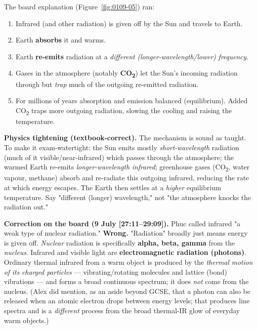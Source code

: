 \documentclass[11pt,a4paper]{article}
\newcommand{\ts}[1]{\textup{[#1]}}       %
\begin{document}
The board explanation (Figure~\ref{fig:0109-05}) ran:
\begin{enumerate}[leftmargin=1.5em,itemsep=1pt]
  \item Infrared (and other radiation) is given off by the Sun and travels to Earth.
  \item Earth \textbf{absorbs} it and warms.
  \item Earth \textbf{re-emits} radiation at a \emph{different (longer-wavelength/lower)
        frequency}.
  \item Gases in the atmosphere (notably \textbf{CO\textsubscript{2}}) let the Sun's
        incoming radiation through but \emph{trap} much of the outgoing re-emitted
        radiation.
  \item For millions of years absorption and emission balanced (equilibrium). Added
        CO\textsubscript{2} traps more outgoing radiation, slowing the cooling and raising
        the temperature.
\end{enumerate}

\begin{plainbox}
\textbf{Physics tightening (textbook-correct).} The mechanism is sound as taught. To make
it exam-watertight: the Sun emits mostly \emph{short-wavelength} radiation (much of it
visible/near-infrared) which passes through the atmosphere; the warmed Earth re-emits
\emph{longer-wavelength infrared}; greenhouse gases (CO\textsubscript{2}, water vapour,
methane) absorb and re-radiate this outgoing infrared, reducing the rate at which energy
escapes. The Earth then settles at a \emph{higher} equilibrium temperature. Say
"different (longer) wavelength," not "the atmosphere knocks the radiation out."
\end{plainbox}

\begin{watchbox}
\textbf{Correction on the board (9 July \ts{27:11--29:09}).} Phuc called infrared "a weak
type of nuclear radiation." \textbf{Wrong.} "Radiation" broadly just means energy is given
off. \emph{Nuclear} radiation is specifically \textbf{alpha, beta, gamma} from the
\emph{nucleus}. Infrared and visible light are \textbf{electromagnetic radiation (photons)}.
Ordinary thermal infrared from a warm object is produced by the \emph{thermal motion of its
charged particles} --- vibrating/rotating molecules and lattice (bond) vibrations --- and
forms a broad continuous spectrum; it does \emph{not} come from the nucleus. (Alex did
mention, as an aside beyond GCSE, that a photon can also be released when an atomic electron
drops between energy levels; that produces line spectra and is a \emph{different} process
from the broad thermal-IR glow of everyday warm objects.)
\end{watchbox}
\end{document}
